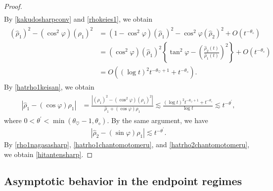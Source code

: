 \documentclass[10pt,a4paper]{amsart}
\numberwithin{equation}{section}
\begin{document}
\begin{proof}
\begin{align}
\end{align}
By \eqref{kakudosharpconv} and \eqref{rhokeies1}, we obtain
\begin{align}\label{hatrho1keisan}
\begin{aligned}
\left(\hat{\rho}_1\right)^2-\left(\cos^2{\varphi}\right)\left(\rho_1\right)^2&=\left(1-\cos^2{\varphi}\right)\left(\hat{\rho}_1\right)^2-\cos^2\varphi\left(\hat{\rho}_2\right)^2+O\left(t^{-\theta_{\diamond}}\right)
\\
&=\left(\cos^2{\varphi}\right)\left(\hat{\rho}_1\right)^2\left\{\tan^2{\varphi}-\left(\frac{\hat{\rho}_2(t)}{\hat{\rho}_1(t)}\right)^2\right\}+O\left(t^{-\theta_{\diamond}}\right)
\\
&=O\left((\log{t})^2t^{-\theta_{\heartsuit}+1}+t^{-\theta_{\diamond}}\right).
\end{aligned}
\end{align}
By \eqref{hatrho1keisan}, we obtain
\begin{align}\label{hatrho1chantomotomeru}
\begin{aligned}
\left|\hat{\rho}_1-\left(\cos{\varphi}\right)\rho_1\right|&=\frac{\left|\left(\hat{\rho}_1\right)^2-\left(\cos^2{\varphi}\right)\left(\rho_1\right)^2\right|}{\hat{\rho}_1+\left(\cos{\varphi}\right)\rho_1}\lesssim \frac{(\log{t})^2t^{-\theta_{\heartsuit}+1}+t^{-\theta_{\diamond}}}{\log{t}}\lesssim t^{-\theta^{\prime}},
\end{aligned}
\end{align}
where $0<\theta^{\prime}<\min{(\theta_{\heartsuit}-1,\theta_{\diamond})}$. By the same argument, we have
\begin{align}\label{hatrho2chantomotomeru}
\left|\hat{\rho}_2-\left(\sin{\varphi}\right)\rho_1\right|\lesssim t^{-\theta^{\prime}}.
\end{align}
By \eqref{rho1nagasasharp}, \eqref{hatrho1chantomotomeru}, and \eqref{hatrho2chantomotomeru}, we obtain \eqref{hitantensharp}.

\end{proof}

\subsection{Asymptotic behavior in the endpoint regimes}
\end{document}
